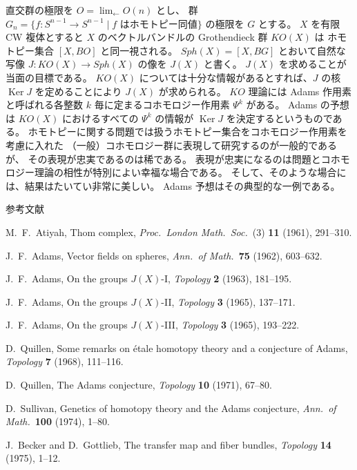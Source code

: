 \documentclass[uplatex,dvipdfmx]{jlreq}
\begin{document}
直交群の極限を $O = \displaystyle\lim_{\leftarrow} O(n)$ とし、
群 $G_n = \{f : S^{n-1} \to S^{n-1} \mid f \text{ はホモトピー同値}\}$ の極限を $G$ とする。
$X$ を有限 CW 複体とすると $X$ のベクトルバンドルの Grothendieck 群 $KO(X)$ は
ホモトピー集合 $[X, BO]$ と同一視される。
$\mathit{Sph}(X) = [X, BG]$ とおいて自然な写像 $J : KO(X) \to \mathit{Sph}(X)$ の像を $J(X)$ と書く。
$J(X)$ を求めることが当面の目標である。
$KO(X)$ については十分な情報があるとすれば、$J$ の核 $\operatorname{Ker} J$ を定めることにより
$J(X)$ が求められる。
$KO$ 理論には Adams 作用素と呼ばれる各整数 $k$ 毎に定まるコホモロジー作用素 $\Psi^k$ がある。
Adams の予想は $KO(X)$ におけるすべての $\Psi^k$ の情報が $\operatorname{Ker} J$ を決定するというものである。
ホモトピーに関する問題では扱うホモトピー集合をコホモロジー作用素を考慮に入れた
（一般）コホモロジー群に表現して研究するのが一般的であるが、
その表現が忠実であるのは稀である。
表現が忠実になるのは問題とコホモロジー理論の相性が特別によい幸福な場合である。
そして、そのような場合には、結果はたいてい非常に美しい。
Adams 予想はその典型的な一例である。

\begin{center}\textsc{参考文献}\end{center}

\begin{enumerate}[{[At61]}]
  \setlength{\itemsep}{2pt}
  \item[{[At61]}] M.~F.~Atiyah,
        Thom complex,
        \textit{Proc.\ London Math.\ Soc.}\ (3) \textbf{11} (1961), 291--310.
  \item[{[Ad62]}] J.~F.~Adams,
        Vector fields on spheres,
        \textit{Ann.\ of Math.}\ \textbf{75} (1962), 603--632.
  \item[{[Ad63]}] J.~F.~Adams,
        On the groups $J(X)$-I,
        \textit{Topology} \textbf{2} (1963), 181--195.
  \item[{[Ad65a]}] J.~F.~Adams,
        On the groups $J(X)$-II,
        \textit{Topology} \textbf{3} (1965), 137--171.
  \item[{[Ad65b]}] J.~F.~Adams,
        On the groups $J(X)$-III,
        \textit{Topology} \textbf{3} (1965), 193--222.
  \item[{[Q68]}] D.~Quillen,
        Some remarks on étale homotopy theory and a conjecture of Adams,
        \textit{Topology} \textbf{7} (1968), 111--116.
  \item[{[Q71]}] D.~Quillen,
        The Adams conjecture,
        \textit{Topology} \textbf{10} (1971), 67--80.
  \item[{[S74]}] D.~Sullivan,
        Genetics of homotopy theory and the Adams conjecture,
        \textit{Ann.\ of Math.}\ \textbf{100} (1974), 1--80.
  \item[{[BG75]}] J.~Becker and D.~Gottlieb,
        The transfer map and fiber bundles,
        \textit{Topology} \textbf{14} (1975), 1--12.
\end{enumerate}
\end{document}
